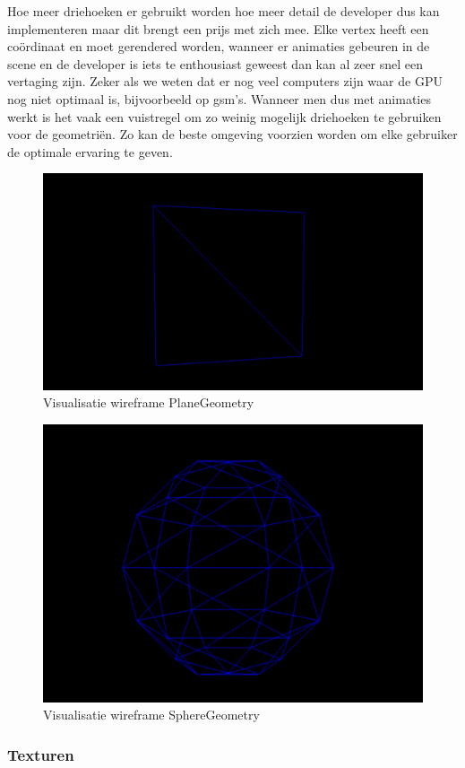 Hoe meer driehoeken er gebruikt worden hoe meer detail de developer dus kan implementeren maar dit brengt een prijs met zich mee. Elke vertex heeft een coördinaat en moet gerendered worden, wanneer er animaties gebeuren in de scene en de developer is iets te enthousiast geweest dan kan al zeer snel een vertaging zijn. Zeker als we weten dat er nog veel computers zijn waar de GPU nog niet optimaal is, bijvoorbeeld op gsm's. Wanneer men dus met animaties werkt is het vaak een vuistregel om zo weinig mogelijk driehoeken te gebruiken voor de geometriën. Zo kan de beste omgeving voorzien worden om elke gebruiker de optimale ervaring te geven.

\begin{figure}[h]
	\centering
	\includegraphics[width=.7\linewidth]{graphics/planeGeometry}
	\caption[Visualisatie wireframe PlaneGeometry]{Visualisatie wireframe PlaneGeometry}
	\label{fig:planeGeometry}
\end{figure}

\begin{figure}[h]
	\centering
	\includegraphics[width=.7\linewidth]{graphics/sphereGeometry}
	\caption[Visualisatie wireframe SphereGeometry]{Visualisatie wireframe SphereGeometry}
	\label{fig:sphereGeometry}
\end{figure}

\newpage
\subsubsection{Texturen}

